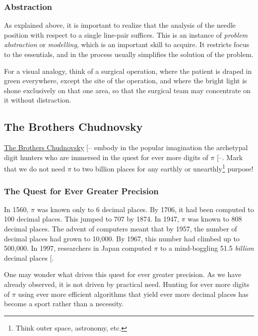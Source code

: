 \documentclass[
  a4paper,
]{article}
\begin{document}
\subsubsection{Abstraction}\label{abstraction}

As explained above, it is important to realize that the analysis of the
needle position with respect to a single line-pair suffices. This is an
instance of \emph{problem abstraction} or \emph{modelling}, which is an
important skill to acquire. It restricts focus to the essentials, and in
the process usually simplifies the solution of the problem.

For a visual analogy, think of a surgical operation, where the patient
is draped in green everywhere, except the site of the operation, and
where the bright light is shone exclusively on that one area, so that
the surgical team may concentrate on it without distraction.

\subsection{The Brothers Chudnovsky}\label{the-brothers-chudnovsky}

\href{https://en.wikipedia.org/wiki/Chudnovsky_brothers}{The Brothers
Chudnovsky}
{[}--\citeproc{ref-pi-next-gen-2016}{44}{]}
embody in the popular imagination the archetypal digit hunters who are
immersed in the quest for ever more digits of \(\pi\)
{[}--\citeproc{ref-blatner-1997}{46}{]}.
Mark that we do not need \(\pi\) to two billion places for any earthly
or unearthly\footnote{Think outer space, astronomy, etc.} purpose!

\subsubsection{The Quest for Ever Greater
Precision}\label{the-quest-for-ever-greater-precision}

In 1560, \(\pi\) was known only to 6 decimal places. By 1706, it had
been computed to 100 decimal places. This jumped to 707 by 1874. In
1947, \(\pi\) was known to 808 decimal places. The advent of computers
meant that by 1957, the number of decimal places had grown to 10,000. By
1967, this number had climbed up to 500,000. In 1997, researchers in
Japan computed \(\pi\) to a mind-boggling 51.5 \emph{billion} decimal
places {[}\citeproc{ref-banks-1999}{47}{]}.

One may wonder what drives this quest for ever greater precision. As we
have already observed, it is not driven by practical need. Hunting for
ever more digits of \(\pi\) using ever more efficient algorithms that
yield ever more decimal places has become a sport rather than a
necessity.
\end{document}
